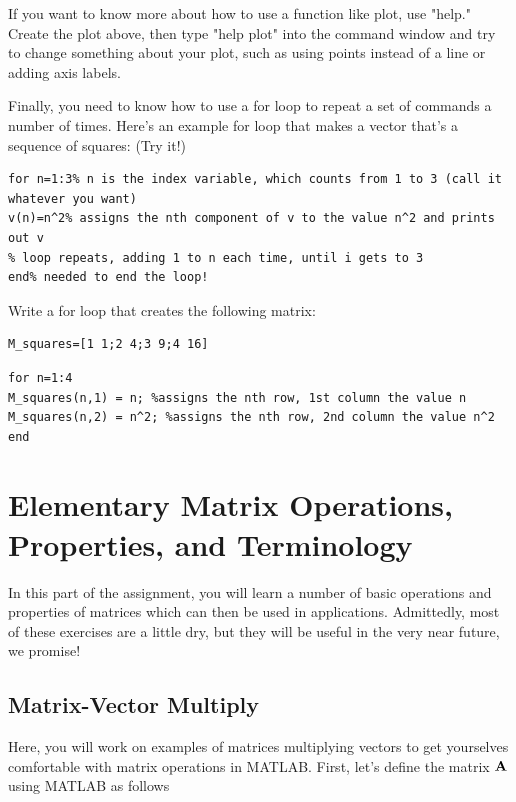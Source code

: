 If you want to know more about how to use a function like plot, use "help." Create the plot above, then type "help plot" into the command window and try to change something about your plot, such as using points instead of a line or adding axis labels.

Finally, you need to know how to use a for loop to repeat a set of commands a number of times. Here's an example for loop that makes a vector that's a sequence of squares: (Try it!)
\begin{lstlisting}
for n=1:3% n is the index variable, which counts from 1 to 3 (call it whatever you want)
v(n)=n^2% assigns the nth component of v to the value n^2 and prints out v
% loop repeats, adding 1 to n each time, until i gets to 3
end% needed to end the loop!
\end{lstlisting}

\begin{prob}
Write a for loop that creates the following matrix:
\begin{lstlisting}
M_squares=[1 1;2 4;3 9;4 16]
\end{lstlisting}
\end{prob}

\begin{sol}
\begin{lstlisting}
for n=1:4
M_squares(n,1) = n; %assigns the nth row, 1st column the value n
M_squares(n,2) = n^2; %assigns the nth row, 2nd column the value n^2
end
\end{lstlisting}
\end{sol}

\section{Elementary Matrix Operations, Properties, and Terminology}

In this part of the assignment, you will learn a number of basic operations and properties of matrices which can then be used in applications.  Admittedly, most of these exercises are a little dry, but they will be useful in the very near future, we promise!

\subsection{Matrix-Vector Multiply}

Here, you will work on examples of matrices multiplying vectors to get yourselves comfortable with matrix operations in MATLAB.  First, let's define the matrix $\mathbf{A}$ using MATLAB as follows

